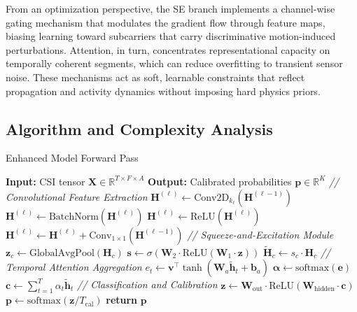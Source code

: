 \documentclass[journal]{IEEEtran}
\begin{document}
From an optimization perspective, the SE branch implements a channel-wise gating mechanism that modulates the gradient flow through feature maps, biasing learning toward subcarriers that carry discriminative motion-induced perturbations. Attention, in turn, concentrates representational capacity on temporally coherent segments, which can reduce overfitting to transient sensor noise. These mechanisms act as soft, learnable constraints that reflect propagation and activity dynamics without imposing hard physics priors.

\subsection{Algorithm and Complexity Analysis}

\begin{algorithm}
\caption{Enhanced Model Forward Pass}
\label{alg:enhanced}
\begin{algorithmic}[1]
\STATE \textbf{Input:} CSI tensor $\mathbf{X} \in \mathbb{R}^{T \times F \times A}$
\STATE \textbf{Output:} Calibrated probabilities $\mathbf{p} \in \mathbb{R}^K$
\STATE
\STATE \textit{// Convolutional Feature Extraction}
    \STATE $\mathbf{H}^{(\ell)} \leftarrow \text{Conv2D}_{k_\ell}(\mathbf{H}^{(\ell-1)})$ 
    \STATE $\mathbf{H}^{(\ell)} \leftarrow \text{BatchNorm}(\mathbf{H}^{(\ell)})$
    \STATE $\mathbf{H}^{(\ell)} \leftarrow \text{ReLU}(\mathbf{H}^{(\ell)})$
        \STATE $\mathbf{H}^{(\ell)} \leftarrow \mathbf{H}^{(\ell)} + \text{Conv}_{1\times1}(\mathbf{H}^{(\ell-1)})$
    \ENDIF
\ENDFOR
\STATE
\STATE \textit{// Squeeze-and-Excitation Module}
    \STATE $\mathbf{z}_c \leftarrow \text{GlobalAvgPool}(\mathbf{H}_c)$ 
    \STATE $\mathbf{s} \leftarrow \sigma(\mathbf{W}_2 \cdot \text{ReLU}(\mathbf{W}_1 \cdot \mathbf{z}))$ 
    \STATE $\tilde{\mathbf{H}}_c \leftarrow s_c \cdot \mathbf{H}_c$ 
\ENDFOR
\STATE
\STATE \textit{// Temporal Attention Aggregation}
    \STATE $e_t \leftarrow \mathbf{v}^\top \tanh(\mathbf{W}_a \tilde{\mathbf{h}}_t + \mathbf{b}_a)$ 
\ENDFOR
\STATE $\boldsymbol{\alpha} \leftarrow \text{softmax}(\mathbf{e})$ 
\STATE $\mathbf{c} \leftarrow \sum_{t=1}^T \alpha_t \tilde{\mathbf{h}}_t$ 
\STATE
\STATE \textit{// Classification and Calibration}
\STATE $\mathbf{z} \leftarrow \mathbf{W}_{\text{out}} \cdot \text{ReLU}(\mathbf{W}_{\text{hidden}} \cdot \mathbf{c})$
\STATE $\mathbf{p} \leftarrow \text{softmax}(\mathbf{z} / T_{\text{cal}})$ 
\STATE \textbf{return} $\mathbf{p}$
\end{algorithmic}
\end{algorithm}
\end{document}
